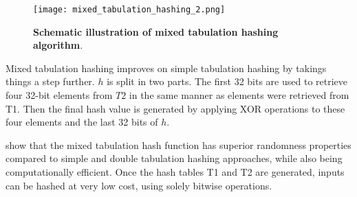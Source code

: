 \begin{figure}[!htb]
    \centering
    \texttt{[image: mixed\_tabulation\_hashing\_2.png]}
    \caption[Schematic illustration of mixed tabulation hashing algorithm]{\textbf{Schematic illustration of mixed tabulation hashing algorithm}.}
    \label{fig:schematic_mixed_tabulation_hashing}
\end{figure}

Mixed tabulation hashing improves on simple tabulation hashing by takings things a step further. $h$ is split in two parts. The first 32 bits are used to retrieve four 32-bit elements from $T2$ in the same manner as elements were retrieved from T1. Then the final hash value is generated by applying XOR operations to these four elements and the last 32 bits of $h$. 

\cite{DahlgaardKRT15} show that the mixed tabulation hash function has superior randomness properties compared to simple and double tabulation \citep{Thorup13} hashing approaches, while also being computationally efficient. Once the hash tables T1 and T2 are generated, inputs can be hashed at very low cost, using solely bitwise operations.






